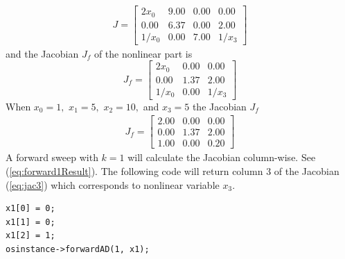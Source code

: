 \documentclass[11pt]{article}
\renewcommand{\_}{{\char"5F}}
\renewcommand{\{}{{\char"7B}}
\renewcommand{\}}{{\char"7D}}
\renewcommand{\^}{{\char"0D}}
\renewcommand{\'}{{\char"0D}}
\begin{document}
\begin{enumerate}[Step 1:]
\begin{eqnarray}
J =
\left[
\begin{array}{rrrr}
2x_{0} &9.00&0.00&0.00   \\
0.00&6.37&0.00&2.00 \\
1/x_{0}&0.00&7.00&1/x_{3}
\end{array}
\right] \label{eq:jac}
\end{eqnarray}
and the Jacobian $J_f$ of the nonlinear part is
%
\begin{equation}
    J_f = \left[
        \begin{array}{ccc}
            2x_0 & 0.00 & 0.00 \\
            0.00  & 1.37 & 2.00 \\
            1/x_0 & 0.00 & 1/x_3
        \end{array}
    \right]  \label{eq:jac2}
\end{equation}
When $x_{0} = 1,$ $x_{1} = 5,$ $x_{2} = 10,$ and $x_{3} = 5$ the Jacobian $J_f$
\begin{eqnarray}
    J_f = \left[
        \begin{array}{ccc}
            2.00 & 0.00 & 0.00 \\
            0.00 & 1.37 & 2.00 \\
            1.00 & 0.00 & 0.20
        \end{array}
    \right] \label{eq:jac3}
\end{eqnarray}
A forward sweep with $k = 1$ will calculate the Jacobian column-wise.  See
(\ref{eq:forward1Result}).  The following code will return column 3 of the Jacobian (\ref{eq:jac3}) which corresponds to nonlinear variable $x_{3}.$
\begin{verbatim}
x1[0] = 0;
x1[1] = 0;
x1[2] = 1;
osinstance->forwardAD(1, x1);
\end{verbatim}


\end{enumerate}
\end{document}
